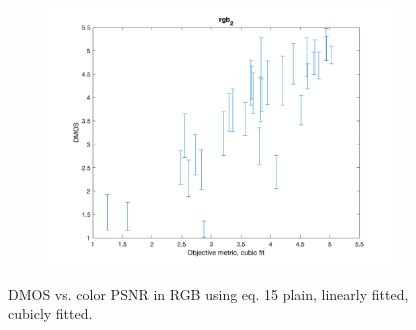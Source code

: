 \documentclass{article}
\begin{document}
\begin{figure}
\begin{subfigure}[b]{0.65\textwidth}
   \includegraphics[width=\textwidth]{Figures/task3/rgb2_cubic.png}
   \end{subfigure}
    \caption{DMOS vs. color PSNR in RGB using eq. 15 plain, linearly fitted, cubicly fitted.}
    \label{fig:rgb2_fitted}
\end{figure}
\end{document}

